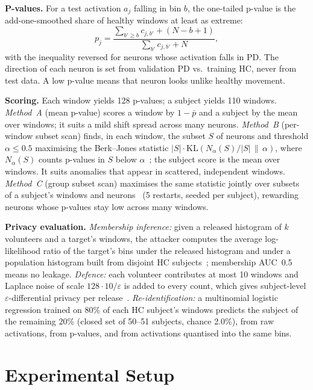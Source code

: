 \documentclass{article}
\begin{document}
\textbf{P-values.} For a test activation $a_j$ falling in bin $b$, the one-tailed p-value is the add-one-smoothed share of healthy windows at least as extreme:
\begin{equation}
p_j = \frac{\sum_{b' \geq b} c_{j,b'} + (N - b + 1)}{\sum_{b'} c_{j,b'} + N},
\end{equation}
with the inequality reversed for neurons whose activation falls in PD. The direction of each neuron is set from validation PD vs.\ training HC, never from test data. A low p-value means that neuron looks unlike healthy movement.

\textbf{Scoring.} Each window yields 128 p-values; a subject yields 110 windows.
\emph{Method~A} (mean p-value) scores a window by $1 - \bar{p}$ and a subject by the mean over windows; it suits a mild shift spread across many neurons.
\emph{Method~B} (per-window subset scan) finds, in each window, the subset $S$ of neurons and threshold $\alpha \leq 0.5$ maximising the Berk--Jones statistic $|S| \cdot \mathrm{KL}\!\left(N_\alpha(S)/|S| \,\|\, \alpha\right)$, where $N_\alpha(S)$ counts p-values in $S$ below $\alpha$~\cite{mcfowland2013fgss}; the subject score is the mean over windows. It suits anomalies that appear in scattered, independent windows.
\emph{Method~C} (group subset scan) maximises the same statistic jointly over subsets of a subject's windows and neurons~\cite{cintas2022group} (5 restarts, seeded per subject), rewarding neurons whose p-values stay low across many windows.

\textbf{Privacy evaluation.} \emph{Membership inference:} given a released histogram of $k$ volunteers and a target's windows, the attacker computes the average log-likelihood ratio of the target's bins under the released histogram and under a population histogram built from disjoint HC subjects~\cite{homer2008resolving}; membership AUC~0.5 means no leakage. \emph{Defence:} each volunteer contributes at most 10 windows and Laplace noise of scale $128 \cdot 10/\varepsilon$ is added to every count, which gives subject-level $\varepsilon$-differential privacy per release~\cite{dwork2006calibrating}. \emph{Re-identification:} a multinomial logistic regression trained on 80\% of each HC subject's windows predicts the subject of the remaining 20\% (closed set of 50--51 subjects, chance 2.0\%), from raw activations, from p-values, and from activations quantised into the same bins.

\section{Experimental Setup}
\label{sec:experiments}
\end{document}

